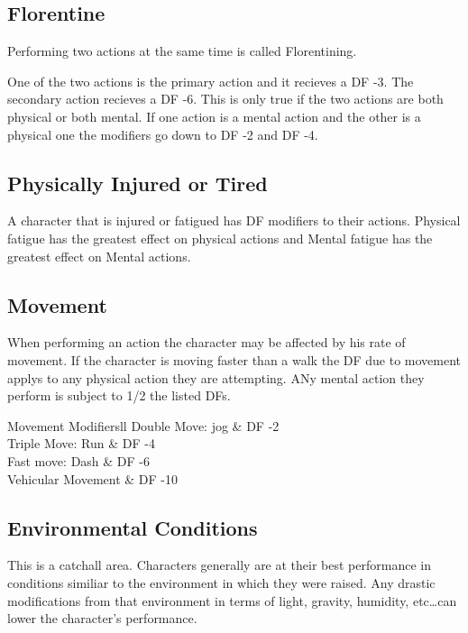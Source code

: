 \subsection{Florentine}

Performing two actions at the same time is called Florentining.

One of the two actions is the primary action and it recieves a 
DF -3. The secondary action recieves a DF -6. This is only true 
if the two actions are both physical or both mental. If one 
action is a mental action and the other is a physical one the modifiers
go down to DF -2 and DF -4.



\subsection{Physically Injured or Tired}

A character that is injured or fatigued has DF modifiers to 
their actions. Physical fatigue has the greatest effect on physical actions 
and Mental fatigue has the greatest effect on Mental actions.




\subsection{Movement} 

When performing an action the character may be affected by 
his rate of movement. If the character is moving faster than a 
walk the DF due to movement applys to any physical action they are 
attempting. ANy mental action they perform is subject to 1/2 
the listed DFs.

\begin{stable}{Movement Modifiers}{ll}
	Double Move: jog							  & DF -2 \\
	Triple Move: Run							  & DF -4 \\
	Fast move: Dash							 & DF -6\\
	Vehicular Movement							& DF -10 \\ 
\end{stable}

\subsection{Environmental Conditions}

This is a catchall area. Characters generally are at their best 
performance in conditions similiar to the environment in which they 
were raised. Any drastic modifications from that environment in 
terms of light, gravity, humidity, etc\dots can lower the character's 
performance.

